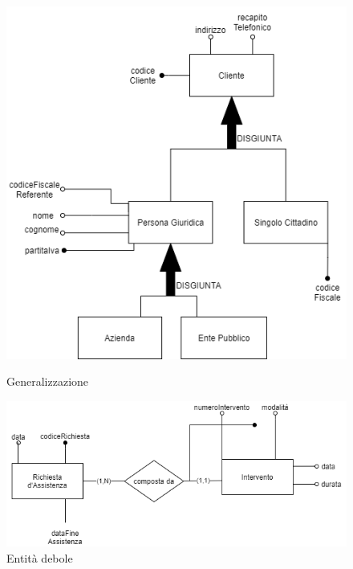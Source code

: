 \documentclass[legalpaper]{article}
\begin{document}
\begin{figure}
		\centering
		\begin{minipage}[b]{0.4\textwidth}
			\includegraphics[width=\linewidth]{image/generalizzazione.png}
				\caption{Generalizzazione}
			\label{fig:generalizzazione}
	\end{minipage}
	\hfill
	\begin{minipage}[b]{0.4\textwidth}
		\includegraphics[width=\linewidth]{image/entita_debole.png}
		\caption{Entità debole}
		\label{fig:enita_debole}
	\end{minipage}
\end{figure}
\end{document}
